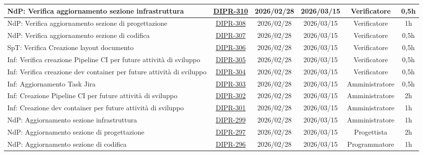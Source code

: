 \documentclass[a4paper,12pt]{article}
\begin{document}
\begin{spacing}{1}
\begin{longtable}{|p{4cm}|c|c|c|c|c|}
        NdP: Verifica aggiornamento sezione infrastruttura & \href{https://7zpus.atlassian.net/browse/DIPR-310}{DIPR-310} & 2026/02/28 & 2026/03/15 & Verificatore & 0,5h \\
        \hline
        NdP: Verifica aggiornamento sezione di progettazione & \href{https://7zpus.atlassian.net/browse/DIPR-308}{DIPR-308} & 2026/02/28 & 2026/03/15 & Verificatore & 1h \\
        \hline
        NdP: Verifica aggiornamento sezione di codifica & \href{https://7zpus.atlassian.net/browse/DIPR-307}{DIPR-307} & 2026/02/28 & 2026/03/15 & Verificatore & 0,5h \\
        \hline
        SpT: Verifica Creazione layout documento & \href{https://7zpus.atlassian.net/browse/DIPR-306}{DIPR-306} & 2026/02/28 & 2026/03/15 & Verificatore & 0,5h \\
        \hline
        Inf: Verifica creazione Pipeline CI per future attività di sviluppo & \href{https://7zpus.atlassian.net/browse/DIPR-305}{DIPR-305} & 2026/02/28 & 2026/03/15 & Verificatore & 0,5h \\
        \hline
        Inf: Verifica creazione dev container per future attività di sviluppo & \href{https://7zpus.atlassian.net/browse/DIPR-304}{DIPR-304} & 2026/02/28 & 2026/03/15 & Verificatore & 0,5h \\
        \hline
        Inf: Aggiornamento Task Jira & \href{https://7zpus.atlassian.net/browse/DIPR-303}{DIPR-303} & 2026/02/28 & 2026/03/15 & Amministratore & 0,5h \\
        \hline
        Inf: Creazione Pipeline CI per future attività di sviluppo & \href{https://7zpus.atlassian.net/browse/DIPR-302}{DIPR-302} & 2026/02/28 & 2026/03/15 & Amministratore & 2h \\
        \hline
        Inf: Creazione dev container per future attività di sviluppo & \href{https://7zpus.atlassian.net/browse/DIPR-301}{DIPR-301} & 2026/02/28 & 2026/03/15 & Amministratore & 1h \\
        \hline
        NdP: Aggiornamento sezione infrastruttura & \href{https://7zpus.atlassian.net/browse/DIPR-299}{DIPR-299} & 2026/02/28 & 2026/03/15 & Amministratore & 1h \\
        \hline
        NdP: Aggiornamento sezione di progettazione & \href{https://7zpus.atlassian.net/browse/DIPR-297}{DIPR-297} & 2026/02/28 & 2026/03/15 & Progettista & 2h \\
        \hline
        NdP: Aggiornamento sezione di codifica & \href{https://7zpus.atlassian.net/browse/DIPR-296}{DIPR-296} & 2026/02/28 & 2026/03/15 & Programmatore & 1h \\

\end{longtable}
\end{spacing}
\end{document}
